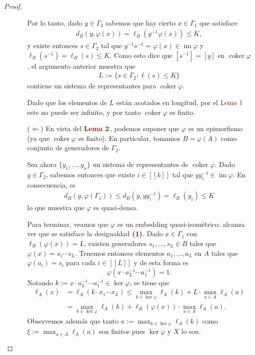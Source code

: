 \documentclass[11pt]{article}
\theoremstyle{colored}
\newcommand{\nat}[1]{[\![#1]\!]}
\newcommand{\im}{\operatorname{im}}
\newcommand{\coker}{\operatorname{coker}}
\newcommand{\paint}[1]{\color{color}{#1}}
\newcommand{\tpaint}[1]{\paint{\textbf{#1}}}
\begin{document}
\begin{proof}
\begin{itemize}[listparindent = \parindent]
\begin{itemize}[listparindent = \parindent]
Por lo tanto, dado $y \in \Gamma_2$ sabemos que hay cierto $x \in \Gamma_1$ que satisface 
\begin{align*}
d_B(y, \varphi(x)) = \ell_B(y^{-1}\varphi(x)) \leq K,
\end{align*}
y existe entonces $s \in \Gamma_2$ tal que $y^{-1}s^{-1} = \varphi(x) \in \im \varphi$ y $\ell_B(s^{-1}) = \ell_B(s) \leq K$. Como esto dice que $[s^{-1}] = [y]$ en $\coker \varphi$, el argumento anterior muestra que
\begin{align*}
L := \{s \in \Gamma_2 : \ell(s) \leq K \}
\end{align*}
contiene un sistema de representantes para $\coker \varphi$. 

Dado que los elementos de $L$ están acotados en longitud, por el $\paint{\text{Lema $1$}}$ este no puede ser infinito, y por tanto $\coker \varphi$ es finito. 
\item[($\Leftarrow$)] En vista del $\tpaint{Lema 2}$, podemos suponer que $\varphi$ es un epimorfismo (ya que $\coker \varphi$ es finito). En particular, tomamos $B = \varphi(A)$ como conjunto de generadores de $\Gamma_2$. 

Sea ahora $\{y_1, \dots, y_n\}$ un sistema de representantes de $\coker \varphi$. Dado $y \in \Gamma_2$, sabemos entonces que existe $i \in \nat{k}$ tal que $yy_i^{-1} \in \im \varphi$. En consecuencia, es
\begin{align*}
d_B(y,\varphi(\Gamma_1)) \leq d_B(y,yy_i^{-1}) = \ell_B(y_i) \leq K
\end{align*}
lo que muestra que $\varphi$ es quasi-densa.

Para terminar, veamos que $\varphi$ es un embedding quasi-isométrico: alcanza ver que se satisface la desigualdad $\tpaint{(1)}$. Dado $x \in \Gamma_1$ con $\ell_B(\varphi(x)) = L$, existen generadores $s_1, \dots, s_L \in B$ tales que $\varphi(x) = s_1 \cdots s_L$. Tenemos entonces elementos $a_1, \dots, a_L$ en $A$ tales que $\varphi(a_i) = s_i$ para cada $i \in \nat{L}$ y de esta forma es
\[
\varphi(x \cdot a_L^{-1} \cdots a_1^{-1}) = 1.
\]
Notando $k := x \cdot a_L^{-1} \cdots a_1^{-1} \in \ker \varphi$, se tiene que
\begin{align*}
\ell_A(x) &= \ell_A(k \cdot x_1 \cdots x_L) \leq \max_{k \in \ker \varphi}\ell_A(k) + L \cdot \max_{a \in A}\ell_A(a)\\ &= \max_{k \in \ker \varphi}\ell_A(k) + \ell_B(\varphi(x)) \cdot \max_{a \in A}\ell_A(a). 
\end{align*}
Observemos  además que tanto $\kappa := \max_{k \in \ker \varphi}\ell_A(k)$ como $\xi := \max_{a \in A}\ell_A(a)$ son finitos pues $\ker \varphi$ y $X$ lo son. 


\end{itemize}
\end{itemize}
\end{proof}
\end{document}
